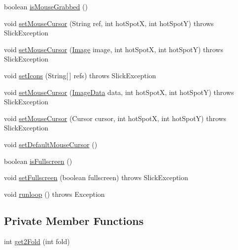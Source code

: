 \begin{DoxyCompactItemize}
\item 
boolean \mbox{\hyperlink{classorg_1_1newdawn_1_1slick_1_1_applet_game_container_1_1_container_aeca48211828d50dfccaaab0769cfb67b}{is\+Mouse\+Grabbed}} ()
\item 
void \mbox{\hyperlink{classorg_1_1newdawn_1_1slick_1_1_applet_game_container_1_1_container_a84b0d6f06392817caf96cf8f039190cd}{set\+Mouse\+Cursor}} (String ref, int hot\+SpotX, int hot\+SpotY)  throws Slick\+Exception 
\item 
void \mbox{\hyperlink{classorg_1_1newdawn_1_1slick_1_1_applet_game_container_1_1_container_a8080eb4d0538a0dfc9ae43dfae3f07d0}{set\+Mouse\+Cursor}} (\mbox{\hyperlink{classorg_1_1newdawn_1_1slick_1_1_image}{Image}} image, int hot\+SpotX, int hot\+SpotY)  throws Slick\+Exception 
\item 
void \mbox{\hyperlink{classorg_1_1newdawn_1_1slick_1_1_applet_game_container_1_1_container_a0d4750d4cebf41d78a06c4808e52a3db}{set\+Icons}} (String\mbox{[}$\,$\mbox{]} refs)  throws Slick\+Exception 
\item 
void \mbox{\hyperlink{classorg_1_1newdawn_1_1slick_1_1_applet_game_container_1_1_container_abd30babb852ca4b6f04b7e83be1acadd}{set\+Mouse\+Cursor}} (\mbox{\hyperlink{interfaceorg_1_1newdawn_1_1slick_1_1opengl_1_1_image_data}{Image\+Data}} data, int hot\+SpotX, int hot\+SpotY)  throws Slick\+Exception 
\item 
void \mbox{\hyperlink{classorg_1_1newdawn_1_1slick_1_1_applet_game_container_1_1_container_a94e9af2ee3d8b55e8d5a425ffb33207e}{set\+Mouse\+Cursor}} (Cursor cursor, int hot\+SpotX, int hot\+SpotY)  throws Slick\+Exception 
\item 
void \mbox{\hyperlink{classorg_1_1newdawn_1_1slick_1_1_applet_game_container_1_1_container_a563df6ad2a0918faa30545da4ed48cb0}{set\+Default\+Mouse\+Cursor}} ()
\item 
boolean \mbox{\hyperlink{classorg_1_1newdawn_1_1slick_1_1_applet_game_container_1_1_container_aaa2fdeeb3fc168eb5cb44befe9194243}{is\+Fullscreen}} ()
\item 
void \mbox{\hyperlink{classorg_1_1newdawn_1_1slick_1_1_applet_game_container_1_1_container_aab072f349c19ee42bcb77a85238ad1c6}{set\+Fullscreen}} (boolean fullscreen)  throws Slick\+Exception 
\item 
void \mbox{\hyperlink{classorg_1_1newdawn_1_1slick_1_1_applet_game_container_1_1_container_a5ca9c4fe320f0593d6794d13ddc7490a}{runloop}} ()  throws Exception 
\end{DoxyCompactItemize}
\subsection*{Private Member Functions}
\begin{DoxyCompactItemize}
\item 
int \mbox{\hyperlink{classorg_1_1newdawn_1_1slick_1_1_applet_game_container_1_1_container_a012fbf7d500ad28d0dccfd9606f0cc1f}{get2\+Fold}} (int fold)
\end{DoxyCompactItemize}
